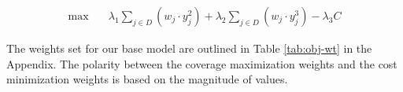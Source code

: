 \begin{align}
    \max \quad & \lambda_1\sum_{j \in D}(w_j \cdot y^2_j) + \lambda_2\sum_{j \in D}(w_j \cdot y^3_j) - \lambda_3C \tag{WT-LP} \label{WT-LP}
\end{align}

The weights set for our base model are outlined in Table \ref{tab:obj-wt} in the Appendix. The polarity between the coverage maximization weights and the cost minimization weights is based on the magnitude of values.


